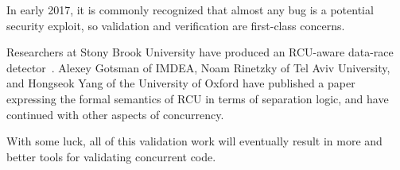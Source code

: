 In early 2017, it is commonly recognized that almost any bug is a potential
security exploit, so validation and verification are first-class concerns.

Researchers at Stony Brook University have produced an RCU-aware data-race
detector~\cite{AbhinavDuggal2010Masters,JustinSeyster2012PhD,Seyster:2011:RFA:2075416.2075425}.
Alexey Gotsman of IMDEA, Noam Rinetzky of Tel Aviv University,
and Hongseok Yang of the University of Oxford have published a
paper~\cite{AlexeyGotsman2012VerifyGraceExtended} expressing the formal
semantics of RCU in terms of separation logic, and have continued with
other aspects of concurrency.

With some luck, all of this validation work will eventually result in
more and better tools for validating concurrent code.
